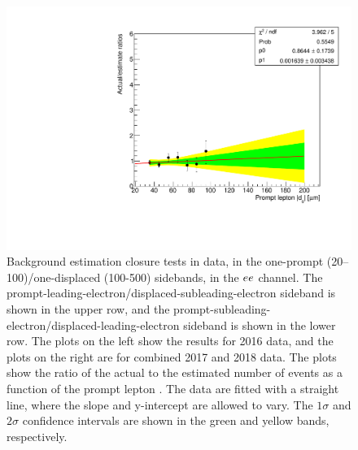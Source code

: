 \begin{figure}[hbtp]
\includegraphics[scale=0.35]{figures/bg/ee_data_2017_2018_displacedLeading_ratiosVsPromptD0.pdf}
\caption{Background estimation closure tests in data, in the one-prompt (20--100\mum)/one-displaced (100-500\mum) sidebands, in the $ee$ channel. The prompt-leading-electron/displaced-subleading-electron sideband is shown in the upper row, and the prompt-subleading-electron/displaced-leading-electron sideband is shown in the lower row. The plots on the left show the results for 2016 data, and the plots on the right are for combined 2017 and 2018 data. The plots show the ratio of the actual to the estimated number of events as a function of the prompt lepton \ad. The data are fitted with a straight line, where the slope and y-intercept are allowed to vary. The $1\sigma$ and $2\sigma$ confidence intervals are shown in the green and yellow bands, respectively.}
\label{100to500um_fits_ee}
\end{figure}


